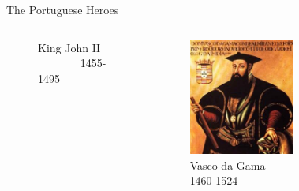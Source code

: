 \documentclass{beamer}
\begin{document}
\begin{frame}{The Portuguese Heroes}
\begin{columns}
\begin{figure}[ht]
\begin{center}
    	\caption{\tiny King John II ~~~~~~~ 1455-1495}
	\end{center}
	\end{figure}
	\begin{figure}[ht]
	\begin{center}
	\includegraphics[width=0.9 \columnwidth]{Vasco.jpg}
	\caption{\tiny Vasco da Gama ~~~ 1460-1524}
	\end{center}
	\end{figure}
	\begin{figure}[ht]
	\begin{center}

\end{center}
\end{figure}
\end{columns}
\end{frame}
\end{document}
